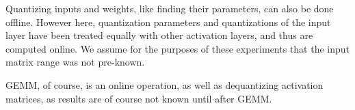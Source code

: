 Quantizing inputs and weights, like finding their parameters, can also be done offline. However here, quantization parameters and quantizations of the input layer have been treated equally with other activation layers, and thus are computed online. We assume for the purposes of these experiments that the input matrix range was not pre-known.

GEMM, of course, is an online operation, as well as dequantizing activation matrices, as results are of course not known until after GEMM.